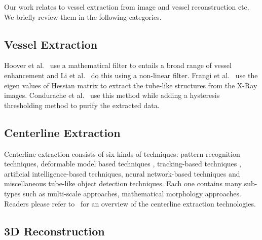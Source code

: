 
Our work relates to vessel extraction from image and vessel
reconstruction etc. We briefly review them in the following
categories.

\subsection*{Vessel Extraction}
Hoover et al.~\cite{Hoover} use a mathematical filter to entails a
broad range of vessel enhancement and Li et al.~\cite{Li} do this
using a non-linear filter. Frangi et al.~\cite{Frangi} use the eigen
values of Hessian matrix to extract the tube-like structures from the
X-Ray images. Condurache et al.~\cite{Condurache} use this method
while adding a hysteresis thresholding method to purify the extracted
data.

\subsection*{Centerline Extraction}
Centerline extraction consists of six kinds of techniques: pattern
recognition techniques, deformable model based techniques
\cite{Deformable1}\cite{Deformable2}\cite{Deformable3}, tracking-based
techniques \cite{Tracking1}\cite{Tracking2}\cite{Tracking3} \cite{Tracking4}
\cite{Tracking5}, artificial intelligence-based techniques, neural
network-based techniques and miscellaneous tube-like object detection
techniques. Each one contains many sub-types such as multi-scale approaches,
mathematical morphology approaches. Readers please refer to~\cite{Kirbas}
for an overview of the centerline extraction technologies.

\subsection*{3D Reconstruction}

